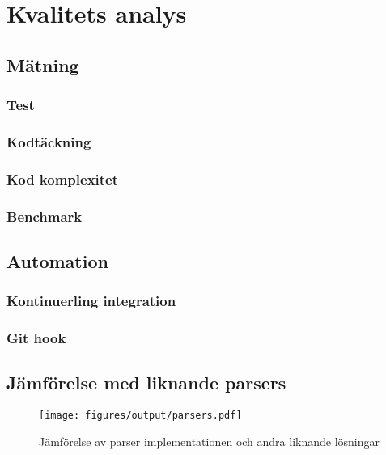 \section{Kvalitets analys}

\subsection{Mätning}

\subsubsection{Test}

\subsubsection{Kodtäckning}

\subsubsection{Kod komplexitet}

\subsubsection{Benchmark}

\subsection{Automation}

\subsubsection{Kontinuerling integration}

\subsubsection{Git hook}

\subsection{Jämförelse med liknande parsers}

\begin{figure}[ht]
  \texttt{[image: figures/output/parsers.pdf]}
  \caption{Jämförelse av parser implementationen och andra liknande lösningar}
\end{figure}

